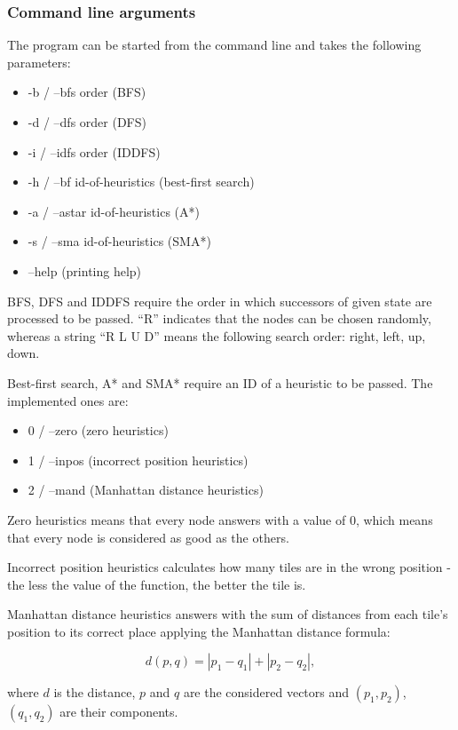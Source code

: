 \documentclass[12pt]{article}
\begin{document}
\subsubsection{Command line arguments}

The program can be started from the command line and takes the following parameters:

\begin{itemize}
    \item -b / --bfs order (BFS)
    \item -d / --dfs order (DFS)
    \item -i / --idfs order (IDDFS)
    \item -h / --bf id-of-heuristics (best-first search)
    \item -a / --astar id-of-heuristics (A*)
    \item -s / --sma id-of-heuristics (SMA*)
    \item --help (printing help)
\end{itemize}

BFS, DFS and IDDFS require the order in which successors of given state are processed to be passed. ``R'' indicates that the nodes can be chosen randomly, whereas a string ``R L U D'' means the following search order: right, left, up, down.

Best-first search, A* and SMA* require an ID of a heuristic to be passed. The implemented ones are:

\begin{itemize}
    \item 0 / --zero (zero heuristics)
    \item  1 / --inpos (incorrect position heuristics)
    \item 2 / --mand (Manhattan distance heuristics)
\end{itemize}

Zero heuristics means that every node answers with a value of 0, which means that every node is considered as good as the others.

Incorrect position heuristics calculates how many tiles are in the wrong position - the less the value of the function, the better the tile is.

Manhattan distance heuristics answers with the sum of distances from each tile's position to its correct place applying the Manhattan distance formula:

\[
    d(p, q) = |p_1 - q_1| + |p_2 - q_2|,
\]

where $d$ is the distance, $p$ and $q$ are the considered vectors and $(p_1, p_2)$, $(q_1, q_2)$ are their components.
\end{document}
